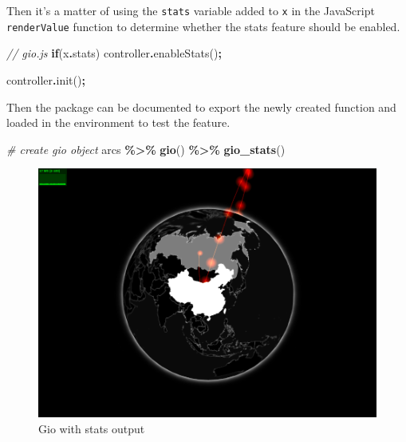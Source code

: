 \documentclass[
]{krantz}
\makeatletter
\newenvironment{Shaded}{\begin{snugshade}}{\end{snugshade}}
\newcommand{\AttributeTok}[1]{\textcolor[rgb]{0.61,0.61,0.61}{#1}}
\newcommand{\CommentTok}[1]{\textcolor[rgb]{0.37,0.37,0.37}{\textit{#1}}}
\newcommand{\ControlFlowTok}[1]{\textcolor[rgb]{0.27,0.27,0.27}{\textbf{#1}}}
\newcommand{\FunctionTok}[1]{\textcolor[rgb]{0,0,0}{#1}}
\newcommand{\KeywordTok}[1]{\textcolor[rgb]{0.27,0.27,0.27}{\textbf{#1}}}
\newcommand{\NormalTok}[1]{#1}
\newcommand{\OperatorTok}[1]{\textcolor[rgb]{0.43,0.43,0.43}{\textbf{#1}}}
\newcommand{\StringTok}[1]{\textcolor[rgb]{0.5,0.5,0.5}{#1}}
\newenvironment{kframe}{%
\medskip{}
\setlength{\fboxsep}{.8em}
 \def\at@end@of@kframe{}%
 \ifinner\ifhmode%
  \def\at@end@of@kframe{\end{minipage}}%
  \begin{minipage}{\columnwidth}%
 \fi\fi%
 \def\FrameCommand##1{\hskip\@totalleftmargin \hskip-\fboxsep
 \colorbox{shadecolor}{##1}\hskip-\fboxsep
     \hskip-\linewidth \hskip-\@totalleftmargin \hskip\columnwidth}%
 \MakeFramed {\advance\hsize-\width
   \@totalleftmargin\z@ \linewidth\hsize
   \@setminipage}}%
 {\par\unskip\endMakeFramed%
 \at@end@of@kframe}
\renewenvironment{Shaded}{\begin{kframe}}{\end{kframe}}
\makeatother
\begin{document}
Then it's a matter of using the \texttt{stats} variable added to \texttt{x} in the JavaScript \texttt{renderValue} function to determine whether the stats feature should be enabled.

\begin{Shaded}
\begin{Highlighting}[]
\CommentTok{// gio.js}
\ControlFlowTok{if}\NormalTok{(x}\OperatorTok{.}\AttributeTok{stats}\NormalTok{)}
\NormalTok{  controller}\OperatorTok{.}\FunctionTok{enableStats}\NormalTok{()}\OperatorTok{;}

\NormalTok{controller}\OperatorTok{.}\FunctionTok{init}\NormalTok{()}\OperatorTok{;}
\end{Highlighting}
\end{Shaded}

Then the package can be documented to export the newly created function and loaded in the environment to test the feature.

\begin{Shaded}
\begin{Highlighting}[]
\CommentTok{\# create gio object}
\NormalTok{arcs }\OperatorTok{\%\textgreater{}\%}\StringTok{ }
\StringTok{  }\KeywordTok{gio}\NormalTok{() }\OperatorTok{\%\textgreater{}\%}\StringTok{ }
\StringTok{  }\KeywordTok{gio\_stats}\NormalTok{()}
\end{Highlighting}
\end{Shaded}

\begin{figure}
\centering
\includegraphics{images/stats.png}
\caption{Gio with stats output}
\end{figure}
\end{document}
